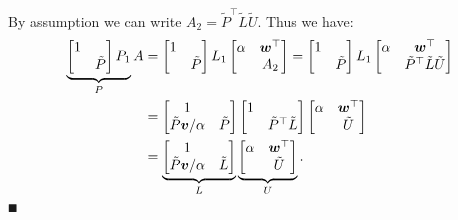 By assumption we can write $A_2 = \tilde{P}^\ensuremath{\top} \tilde{L} \tilde{U}$. Thus we have:
\begin{align*}
\underbrace{\begin{bmatrix} 1 \\
            & \tilde{P} \end{bmatrix} P_1}_P A &= \begin{bmatrix} 1 \\
            & \tilde{P} \end{bmatrix} L_1 \begin{bmatrix} \alpha & \bm{{\mbox{\boldmath$w$\unboldmath}}}^\top \\
                         & A_2
                        \end{bmatrix}  =
            \begin{bmatrix} 1 \\ & \tilde{P} \end{bmatrix} L_1  \begin{bmatrix} \alpha & \bm{{\mbox{\boldmath$w$\unboldmath}}}^\top \\  & \tilde{P}^\top \tilde{L}  \tilde{U} \end{bmatrix} \\
            &= \begin{bmatrix}
1 \\
\tilde{P} \bm{{\mbox{\boldmath$v$\unboldmath}}}/\alpha & \tilde{P} \end{bmatrix} \begin{bmatrix} 1 &  \\  &  \tilde{P}^\top \tilde{L}  \end{bmatrix}  \begin{bmatrix} \alpha & \bm{{\mbox{\boldmath$w$\unboldmath}}}^\top \\  &  \tilde{U} \end{bmatrix} \\
&= \underbrace{\begin{bmatrix}
1 \\
\tilde{P} \bm{{\mbox{\boldmath$v$\unboldmath}}}/\alpha & \tilde{L}  \end{bmatrix}}_L \underbrace{\begin{bmatrix} \alpha & \bm{{\mbox{\boldmath$w$\unboldmath}}}^\top \\  &  \tilde{U} \end{bmatrix}}_U. \\
\end{align*}
\ensuremath{\QED}

